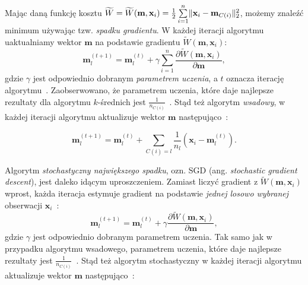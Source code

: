 \documentclass{praca1}
\DeclarePairedDelimiter{\norm}{\lVert}{\rVert}
\begin{document}
Mając daną funkcję kosztu $\widetilde{W} = \widetilde{W}(\mathbf{m}, \mathbf{x}_i) = \frac{1}{2}\sum\limits_{i=1}^{n} \norm{\mathbf{x}_i - \mathbf{m}_{C(i)}}_2^2 $, możemy znaleźć minimum używając tzw. \emph{spadku gradientu}. W każdej iteracji algorytmu uaktualniamy wektor $\mathbf{m}$ na podstawie gradientu $\widetilde{W}(\mathbf{m}, \mathbf{x}_i)$:
\begin{equation}
\mathbf{m}^{(t+1)}_l = \mathbf{m}_l^{(t)} + \gamma \sum\limits_{i=1}^{n} \frac{\partial \widetilde{W}(\mathbf{m}, \mathbf{x}_i)}{\partial \mathbf{m}},
\end{equation}
gdzie $\gamma$ jest odpowiednio dobranym \emph{parametrem uczenia}, a $t$ oznacza iterację algorytmu~\cite{Bottou2012:sgdtricks}. Zaobserwowano, że parametrem uczenia, które daje najlepsze rezultaty dla algorytmu $k$-średnich jest $\frac{1}{n_{C(i)}}$~\cite{Bottou1995:convergenceproperties}. Stąd też algorytm \emph{wsadowy}, w każdej iteracji algorytmu aktualizuje wektor $\mathbf{m}$ następująco~\cite{Bottou1995:convergenceproperties}:



\begin{equation}
\mathbf{m}_l^{(t+1)} = \mathbf{m}_l^{(t)} + \sum\limits_{C(i) = l}   \frac{1}{n_l}(\mathbf{x}_i - \mathbf{m}^{(t)}_l).
\end{equation}

Algorytm \emph{stochastyczny największego spadku}, ozn. SGD (ang. \emph{stochastic gradient descent}), jest daleko idącym uproszczeniem. Zamiast liczyć gradient z $\widetilde{W}(\mathbf{m}, \mathbf{x}_i)$ wprost, każda iteracja estymuje gradient na podstawie \emph{jednej losowo wybranej} obserwacji $\mathbf{x}_i$~\cite{Bottou2012:sgdtricks}:
\begin{equation}
\mathbf{m}_l^{(t+1)} = \mathbf{m}_l^{(t)} + \gamma \frac{\partial \widetilde{W}(\mathbf{m}, \mathbf{x}_i)}{\partial \mathbf{m}},
\end{equation}
gdzie $\gamma$ jest odpowiednio dobranym parametrem uczenia. Tak samo jak w przypadku algorytmu wsadowego, parametrem uczenia, które daje najlepsze rezultaty jest $\frac{1}{n_{C(i)}}$~\cite{Bottou1995:convergenceproperties}. Stąd też algorytm stochastyczny w każdej iteracji algorytmu aktualizuje wektor $\mathbf{m}$ następująco~\cite{Bottou1995:convergenceproperties}:
\end{document}
